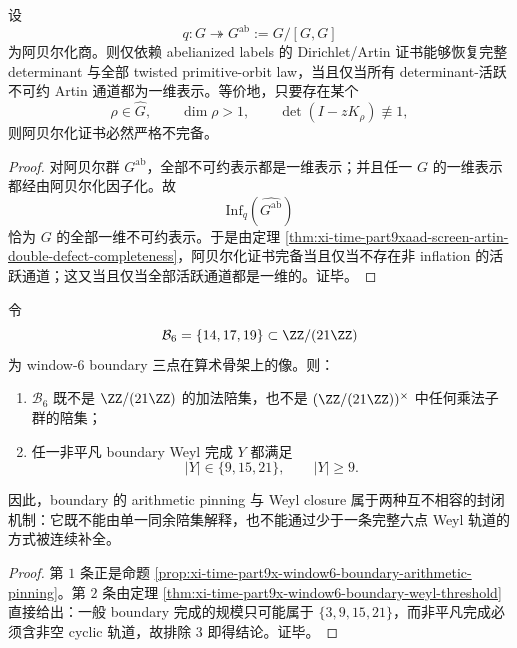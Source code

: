 \begin{corollary}[阿贝尔化证书的完备性充要条件]\label{cor:xi-time-part9xaad-abelianized-certificate-iff-onedim}
设
\[
q:G\twoheadrightarrow G^{\mathrm{ab}}:=G/[G,G]
\]
为阿贝尔化商。则仅依赖 abelianized labels 的 Dirichlet/Artin 证书能够恢复完整 determinant 与全部 twisted primitive-orbit law，当且仅当所有 determinant-活跃不可约 Artin 通道都为一维表示。等价地，只要存在某个
\[
\rho\in\widehat G,
\qquad
\dim\rho>1,
\qquad
\det(I-zK_\rho)\not\equiv 1,
\]
则阿贝尔化证书必然严格不完备。
\end{corollary}
\begin{proof}
对阿贝尔群 \(G^{\mathrm{ab}}\)，全部不可约表示都是一维表示；并且任一 \(G\) 的一维表示都经由阿贝尔化因子化。故
\[
\mathrm{Inf}_q(\widehat{G^{\mathrm{ab}}})
\]
恰为 \(G\) 的全部一维不可约表示。于是由定理 \ref{thm:xi-time-part9xaad-screen-artin-double-defect-completeness}，阿贝尔化证书完备当且仅当不存在非 inflation 的活跃通道；这又当且仅当全部活跃通道都是一维的。证毕。
\end{proof}

\begin{theorem}\label{thm:xi-time-part9xaad-boundary-pinning-weyl-incompatibility}
令
\[
\mathcal B_6=\{14,17,19\}\subset \ZZ/(21\ZZ)
\]
为 window-\(6\) boundary 三点在算术骨架上的像。则：
\begin{enumerate}
  \item \(\mathcal B_6\) 既不是 \(\ZZ/(21\ZZ)\) 的加法陪集，也不是 \((\ZZ/(21\ZZ))^\times\) 中任何乘法子群的陪集；
  \item 任一非平凡 boundary Weyl 完成 \(Y\) 都满足
  \[
  |Y|\in\{9,15,21\},
  \qquad
  |Y|\ge 9.
  \]
\end{enumerate}
因此，boundary 的 arithmetic pinning 与 Weyl closure 属于两种互不相容的封闭机制：它既不能由单一同余陪集解释，也不能通过少于一条完整六点 Weyl 轨道的方式被连续补全。
\end{theorem}
\begin{proof}
第 \(1\) 条正是命题 \ref{prop:xi-time-part9x-window6-boundary-arithmetic-pinning}。第 \(2\) 条由定理 \ref{thm:xi-time-part9x-window6-boundary-weyl-threshold} 直接给出：一般 boundary 完成的规模只可能属于 \(\{3,9,15,21\}\)，而非平凡完成必须含非空 cyclic 轨道，故排除 \(3\) 即得结论。证毕。
\end{proof}

